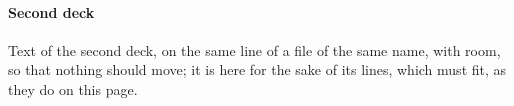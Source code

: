 \label{p-r}
\paragraph*{Second deck}\label{p-c}
Text of the second deck, on the same line of a file of the same name, with
room, so that nothing should move; it is here for the sake of its lines,
which must fit, as they do on this page.

